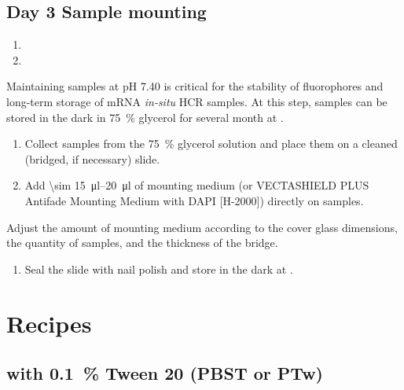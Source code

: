 \documentclass[10pt]{report}
\begin{document}
\subsection*{Day 3 \textendash{} Sample mounting}

\begin{enumerate}[series = steps]
	\item {}
	\item {}
\end{enumerate}

\bigskip\alert{Maintaining samples at pH 7.40 is critical for the stability of fluorophores and long-term storage of mRNA \textit{in-situ} HCR samples.}
\alert{At this step, samples can be stored in the dark in \qty{75}{\percent} glycerol for several month at \fourdegree.}

\begin{enumerate}[resume = steps]
	\item Collect samples from the \qty{75}{\percent} glycerol solution and place them on a cleaned (bridged, if necessary) slide.
	\item Add \qtyrange{\sim 15}{20}{\ul} of mounting medium (or VECTASHIELD\textregistered{} PLUS Antifade Mounting Medium with DAPI [H-2000]) directly on samples.
\end{enumerate}

\bigskip\alert{Adjust the amount of mounting medium according to the cover glass dimensions, the quantity of samples, and the thickness of the bridge.}

\begin{enumerate}[resume = steps]
	\item	Seal the slide with nail polish and store in the dark at \fourdegree.
\end{enumerate}

\clearpage

\section*{\textendash{} Recipes \textendash{}}

\subsection*{\pbs{} with \qty{0.1}{\percent} Tween 20 (PBST or PTw)}
\end{document}
